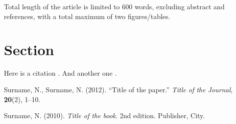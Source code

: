 \documentclass[11pt,a4paper]{article}
\begin{document}
Total length of the article is limited to 600 words, excluding abstract and references, with a total maximum of two figures/tables.

\section{Section}
\label{Sect:section}

\Blindtext

Here is a citation \cite{Ref2}. And another one \cite{Ref1}.



\begin{thebibliography}{99}

 Surname, N., Surname, N. (2012). ``Title of the paper.'' \textit{Title of the Journal}, \textbf{20}(2), 1--10.

 Surname, N. (2010). \textit{Title of the book}. 2nd edition. Publisher, City.

\end{thebibliography}
\end{document}
